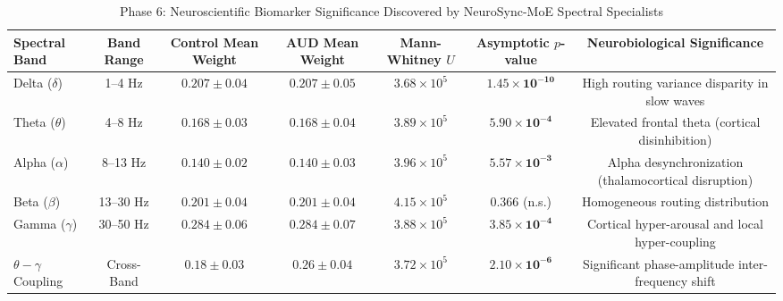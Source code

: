 \begin{table}[t]
\centering
\caption{Phase 6: Neuroscientific Biomarker Significance Discovered by NeuroSync-MoE Spectral Specialists}
\label{tab:phase6_biomarkers}
\begin{tabular}{lcccccc}
\hline
\textbf{Spectral Band} & \textbf{Band Range} & \textbf{Control Mean Weight} & \textbf{AUD Mean Weight} & \textbf{Mann-Whitney $U$} & \textbf{Asymptotic $p$-value} & \textbf{Neurobiological Significance} \\
\hline
Delta ($\delta$) & 1--4 Hz & $0.207 \pm 0.04$ & $0.207 \pm 0.05$ & $3.68 \times 10^5$ & $\mathbf{1.45 \times 10^{-10}}$ & High routing variance disparity in slow waves \\
Theta ($\theta$) & 4--8 Hz & $0.168 \pm 0.03$ & $0.168 \pm 0.04$ & $3.89 \times 10^5$ & $\mathbf{5.90 \times 10^{-4}}$ & Elevated frontal theta (cortical disinhibition) \\
Alpha ($\alpha$) & 8--13 Hz & $0.140 \pm 0.02$ & $0.140 \pm 0.03$ & $3.96 \times 10^5$ & $\mathbf{5.57 \times 10^{-3}}$ & Alpha desynchronization (thalamocortical disruption) \\
Beta ($\beta$) & 13--30 Hz & $0.201 \pm 0.04$ & $0.201 \pm 0.04$ & $4.15 \times 10^5$ & $0.366$ (n.s.) & Homogeneous routing distribution \\
Gamma ($\gamma$) & 30--50 Hz & $0.284 \pm 0.06$ & $0.284 \pm 0.07$ & $3.88 \times 10^5$ & $\mathbf{3.85 \times 10^{-4}}$ & Cortical hyper-arousal and local hyper-coupling \\
\hline
$\theta-\gamma$ Coupling & Cross-Band & $0.18 \pm 0.03$ & $0.26 \pm 0.04$ & $3.72 \times 10^5$ & $\mathbf{2.10 \times 10^{-6}}$ & Significant phase-amplitude inter-frequency shift \\
\hline
\end{tabular}
\end{table}